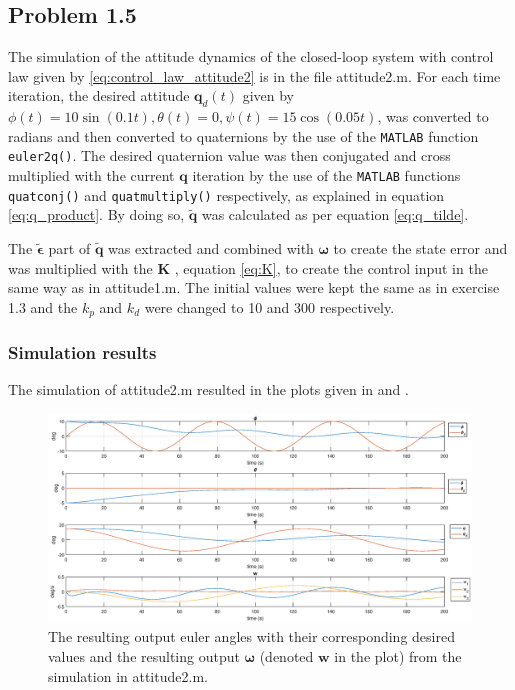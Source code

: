 

\subsection*{Problem 1.5}

The simulation of the attitude dynamics of the closed-loop system with control law given by \eqref{eq:control_law_attitude2} is in the file {\color{blue} attitude2.m}. For each time iteration,
the desired attitude $\mathbf{q}_d(t)$ given by $\phi(t) = 10\sin(0.1t), \theta(t) = 0, \psi(t) = 15\cos(0.05t)$, was converted to radians and then converted to quaternions by the use of the \texttt{MATLAB} function \texttt{euler2q()}. The desired quaternion value was then conjugated and cross multiplied with the current $\mathbf{q}$ iteration by the use of the \texttt{MATLAB} functions \texttt{quatconj()} and \texttt{quatmultiply()} respectively, as explained in equation \eqref{eq:q_product}. By doing so, $\mathbf{\tilde{q}}$ was calculated as per equation \eqref{eq:q_tilde}.

The $\tilde{\boldsymbol{\epsilon}}$ part of $\mathbf{\tilde{q}}$ was extracted and combined with $\boldsymbol{\omega}$ to create the state error and was multiplied with the $\mathbf{K}$ , equation \eqref{eq:K}, to create the control input in the same way as in {\color{blue} attitude1.m}. The initial values were kept the same as in exercise 1.3 and the $k_p$ and $k_d$ were changed to 10 and 300 respectively. 

\subsubsection*{Simulation results}

The simulation  of  {\color{blue} attitude2.m} resulted in the plots given in  and .

\begin{figure}[!htb]
	\centering
	\includegraphics[width=1.00\textwidth]{figures/2_euler.eps}
	\caption{The resulting output euler angles with their corresponding desired values and the resulting output $\boldsymbol{\omega}$ (denoted $\mathbf{w}$ in the plot) from the simulation in attitude2.m.}
\label{fig:sim_attitude2_euler}
\end{figure}

